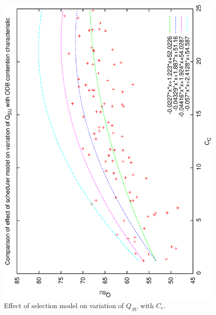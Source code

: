 \begin{figure}[h]
 \label{fig:qsucc_data}
\begin{center}
 \includegraphics[scale=0.5, angle=-90]{figures/qsucc.eps}
 \caption[Effect of selection model on variation of $Q_{SU}$ with $C_c$.] 
   {Effect of selection model on variation of $Q_{SU}$ with $C_c$.}
\end{center}
\end{figure}



